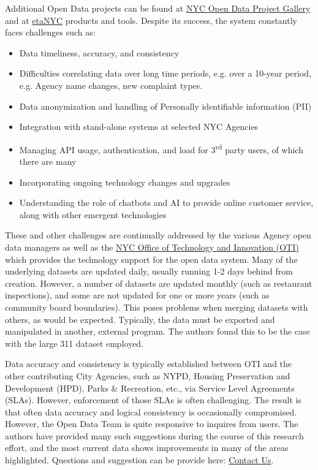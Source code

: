 \documentclass[12pt, titlepage]{article}
\begin{document}
Additional Open Data projects can be found 
at \href{https://opendata.cityofnewyork.us/projects/}{NYC Open Data Project Gallery}
and at \href{https://beta.nyc/beta/products/}{\textbeta etaNYC} products and tools. 
Despite its success, the system constantly faces challenges such as:

\begin{itemize}
	\item Data timeliness, accuracy, and consistency
	\item Difficulties correlating data over long time periods, e.g. over a 10-year 
	period, e.g. Agency name changes, new complaint types.
	\item Data anonymization and handling of Personally identifiable information (PII)
	\item Integration with stand-alone systems at selected NYC Agencies
	\item Managing API usage, authentication, and load for 3\textsuperscript{rd} 
	party users, of which there are many
	\item Incorporating ongoing technology changes and upgrades 
	\item Understanding the role of chatbots and AI to provide online 
	customer service, along with other emergent technologies
\end{itemize}

These and other challenges are continually addressed by the various 
Agency open data managers as well as the 
\href{https://www.nyc.gov/content/oti/pages/}
{NYC Office of Technology and Innovation (OTI)} which provides the 
technology support for the open data system. Many of the underlying 
datasets are updated daily, usually running 1-2 days behind 
from creation. However, a number of datasets are updated 
monthly (such as restaurant inspections), and some are not 
updated for one or more years (such as community board 
boundaries). This poses problems when merging datasets with 
others, as would be expected. Typically, the data must be exported 
and manipulated in another, external program. The authors found 
this to be the case with the large 311 dataset employed.

Data accuracy and consistency is typically established between OTI 
and the other contributing City Agencies, such as NYPD, Housing 
Preservation and Development (HPD), Parks \& Recreation, etc., via 
Service Level Agreements (SLAs). However, enforcement of those 
SLAs is often challenging. The result is that often data accuracy and 
logical consistency is occasionally compromised. However, 
the Open Data Team is quite responsive to inquires from users. The 
authors have provided many such suggestions during the course of this research effort, 
and the most current data shows improvements in many of the areas highlighted. 
Questions and suggestion  can be provide here: 
\href{https://opendata.cityofnewyork.us/engage/}{Contact Us}.
\end{document}
